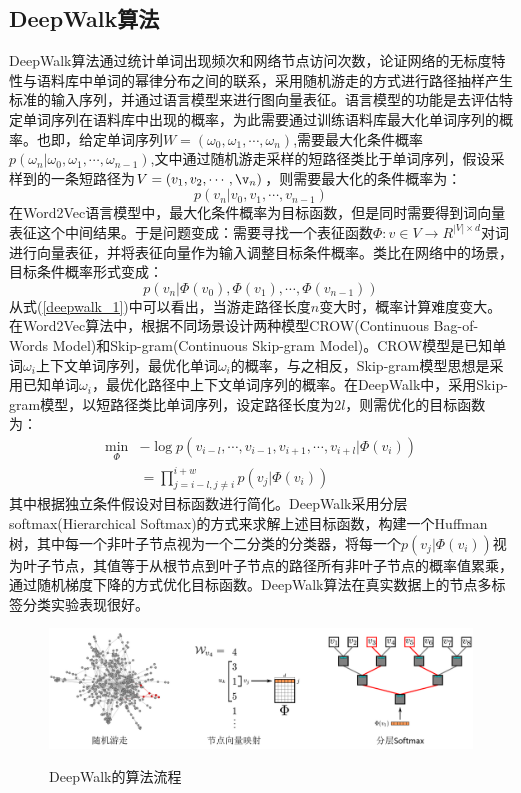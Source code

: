 \subsection{DeepWalk算法}
DeepWalk算法通过统计单词出现频次和网络节点访问次数，论证网络的无标度特性与语料库中单词的幂律分布之间的联系，采用随机游走的方式进行路径抽样产生标准的输入序列，并通过语言模型来进行图向量表征。语言模型的功能是去评估特定单词序列在语料库中出现的概率，为此需要通过训练语料库最大化单词序列的概率。也即，给定单词序列$W = (\omega_0, \omega_1,\cdots,\omega_n)$,需要最大化条件概率$p(\omega_n |\omega_0,\omega_1,\cdots,\omega_{n-1})$,文中通过随机游走采样的短路径类比于单词序列，假设采样到的一条短路径为$V = (v_1, v_2, \cdots, \v_n)$，则需要最大化的条件概率为：
\begin{equation}
	p(v_n | v_0, v_1,\cdots,v_{n-1})
\end{equation}
在Word2Vec语言模型中，最大化条件概率为目标函数，但是同时需要得到词向量表征这个中间结果。于是问题变成：需要寻找一个表征函数$\Phi:v\in V \rightarrow R^{|V|\times d}$对词进行向量表征，并将表征向量作为输入调整目标条件概率。类比在网络中的场景，目标条件概率形式变成：
\begin{equation}\label{deepwalk_1}
	p(v_n | \Phi(v_0), \Phi(v_1),\cdots,\Phi(v_{n-1})) 
\end{equation}
从式(\ref{deepwalk_1})中可以看出，当游走路径长度$n$变大时，概率计算难度变大。在Word2Vec算法中，根据不同场景设计两种模型CROW(Continuous Bag-of-Words Model)和Skip-gram(Continuous Skip-gram Model)。CROW模型是已知单词$\omega_i$上下文单词序列，最优化单词$\omega_i$的概率，与之相反，Skip-gram模型思想是采用已知单词$\omega_i$，最优化路径中上下文单词序列的概率。在DeepWalk中，采用Skip-gram模型，以短路径类比单词序列，设定路径长度为$2l$，则需优化的目标函数为：
\begin{equation}
\begin{aligned}
	\min_{\Phi} &-\log p(v_{i-l},\cdots,v_{i-1},v_{i+1},\cdots,v_{i+l}| \Phi(v_i)) \\
	&= \prod_{j=i-l,j\neq i}^{i+w} p(v_j|\Phi(v_i))
\end{aligned}
\end{equation}
其中根据独立条件假设对目标函数进行简化。DeepWalk采用分层softmax(Hierarchical Softmax)的方式来求解上述目标函数，构建一个Huffman树，其中每一个非叶子节点视为一个二分类的分类器，将每一个$p(v_j|\Phi(v_i))$视为叶子节点，其值等于从根节点到叶子节点的路径所有非叶子节点的概率值累乘，通过随机梯度下降的方式优化目标函数。DeepWalk算法在真实数据上的节点多标签分类实验表现很好。
\begin{figure}[!ht]
	\centering
	{\includegraphics[width=6in]{figures/deepwalk2.png}}
	\caption{DeepWalk的算法流程}\label{img2.5}
\end{figure}


